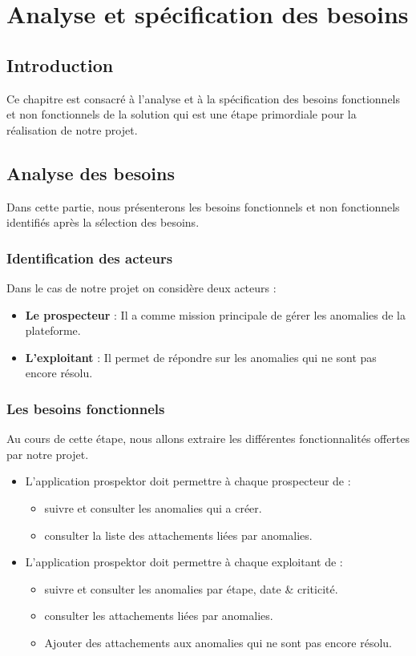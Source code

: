 \chapter{Analyse et sp\'ecification des besoins}
\section{Introduction}
Ce chapitre est consacr\'e \`a l'analyse et \`a la sp\'ecification des besoins fonctionnels et non fonctionnels de la solution qui est une \'etape primordiale pour la r\'ealisation de notre projet.
\section{Analyse des besoins}
Dans cette partie, nous pr\'esenterons les besoins fonctionnels et non fonctionnels identifi\'es apr\`es la s\'election des besoins.
\subsection{Identification des acteurs}
Dans le cas de notre projet on consid\`ere deux acteurs :
\begin{itemize}
\item \textbf{Le prospecteur} : Il a comme mission principale de g\'erer les anomalies de la plateforme.
\item \textbf{L'exploitant} : Il permet de r\'epondre sur les anomalies qui ne sont pas encore r\'esolu.
\end{itemize}
\subsection{Les besoins fonctionnels}
Au cours de cette \'etape, nous allons extraire les diff\'erentes fonctionnalit\'es offertes par notre projet.
\begin{itemize}
\item L'application prospektor doit permettre \`a chaque prospecteur de :
\begin{itemize}
\item suivre et consulter les anomalies qui a cr\'eer.
\item consulter la liste des attachements li\'ees par anomalies.
\end{itemize}
\item L'application prospektor doit permettre \`a chaque exploitant de :
\begin{itemize}
\item suivre et consulter les anomalies par \'etape, date \& criticit\'e.
\item consulter les attachements li\'ees par anomalies.
\item Ajouter des attachements aux anomalies qui ne sont pas encore r\'esolu.
\end{itemize}  
\end{itemize}

